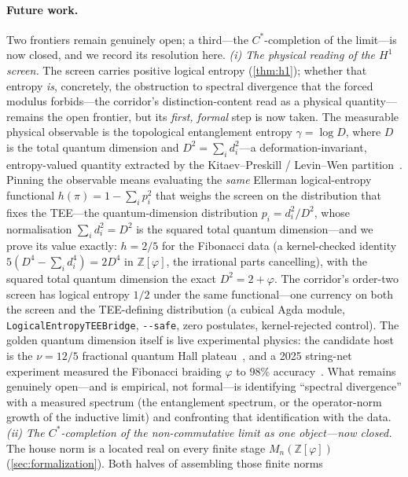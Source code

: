\documentclass[11pt,letterpaper]{article}
\theoremstyle{plain}
\theoremstyle{definition}
\theoremstyle{remark}
\newcommand{\ZZ}{\mathbb{Z}}
\newcommand{\Zphi}{\ZZ[\varphi]}
\begin{document}
\paragraph{Future work.}
Two frontiers remain genuinely open; a third---the $C^\ast$-completion of the
limit---is now closed, and we record its resolution here.
\emph{(i) The physical reading of the $H^1$ screen.} The screen carries positive
logical entropy (\cref{thm:h1}); whether that entropy \emph{is}, concretely, the
obstruction to spectral divergence that the forced modulus forbids---the corridor's
distinction-content read as a physical quantity---remains the open frontier, but its
\emph{first, formal} step is now taken. The measurable physical observable is the
topological entanglement entropy $\gamma = \log D$, where $D$ is the total quantum
dimension and $D^2 = \sum_i d_i^2$---a deformation-invariant, entropy-valued quantity
extracted by the Kitaev--Preskill / Levin--Wen
partition~\citep{kitaev2006topological,levin2006detecting}. Pinning the observable means
evaluating the \emph{same} Ellerman logical-entropy functional $h(\pi)=1-\sum_i p_i^2$ that
weighs the screen on the distribution that fixes the TEE---the quantum-dimension
distribution $p_i = d_i^2/D^2$, whose normalisation $\sum_i d_i^2 = D^2$ is the squared
total quantum dimension---and we prove its value exactly: $h = 2/5$ for the Fibonacci data
(a kernel-checked identity $5(D^4-\sum_i d_i^4)=2D^4$ in $\Zphi$, the irrational parts
cancelling), with the squared total quantum dimension the exact $D^2 = 2+\varphi$. The
corridor's order-two screen has logical entropy $1/2$ under the same functional---one
currency on both the screen and the TEE-defining distribution (a cubical Agda module, \texttt{LogicalEntropyTEEBridge},
\texttt{-{}-safe}, zero postulates, kernel-rejected control). The golden quantum dimension
itself is live experimental physics: the candidate host is the $\nu=12/5$ fractional
quantum Hall plateau~\citep{mong2017fibonacci}, and a 2025 string-net experiment measured
the Fibonacci braiding $\varphi$ to $98\%$ accuracy~\citep{stringnet2025}. What remains
genuinely open---and is empirical, not formal---is identifying ``spectral divergence''
with a measured spectrum (the entanglement spectrum, or the operator-norm growth of the
inductive limit) and confronting that identification with the data. \emph{(ii) The $C^\ast$-completion of the non-commutative limit as
one object---now closed.} The house norm is a located real on every finite stage
$M_n(\Zphi)$ (\cref{sec:formalization}). Both halves of assembling those finite norms
\end{document}
